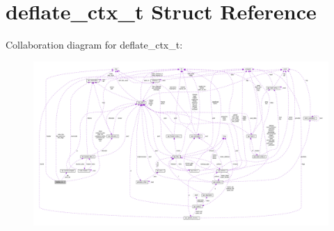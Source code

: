 \hypertarget{structdeflate__ctx__t}{}\section{deflate\+\_\+ctx\+\_\+t Struct Reference}
\label{structdeflate__ctx__t}


Collaboration diagram for deflate\+\_\+ctx\+\_\+t\+:
\nopagebreak
\begin{figure}[H]
\begin{center}
\leavevmode
\includegraphics[width=350pt]{structdeflate__ctx__t__coll__graph}
\end{center}
\end{figure}
